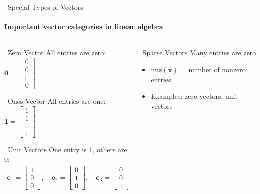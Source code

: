 \documentclass[12pt,aspectratio=169]{beamer}
\begin{document}
\begin{frame}{\faLayerGroup \, Special Types of Vectors}
\framesubtitle{Important vector categories in linear algebra}

\begin{columns}[T]
    \begin{column}{0.5\textwidth}
        \begin{block}{\faCircle \, Zero Vector}
            All entries are zero: $\mathbf{0} = \begin{bmatrix} 0 \\ 0 \\ \vdots \\ 0 \end{bmatrix}$
        \end{block}
        
        \begin{block}{\faSquare \, Ones Vector}
            All entries are one: $\mathbf{1} = \begin{bmatrix} 1 \\ 1 \\ \vdots \\ 1 \end{bmatrix}$
        \end{block}
        
        \begin{block}{\faDotCircle \, Unit Vectors}
            One entry is 1, others are 0:
            \begin{align}
                \mathbf{e}_1 = \begin{bmatrix} 1 \\ 0 \\ 0 \end{bmatrix}, \quad
                \mathbf{e}_2 = \begin{bmatrix} 0 \\ 1 \\ 0 \end{bmatrix}, \quad
                \mathbf{e}_3 = \begin{bmatrix} 0 \\ 0 \\ 1 \end{bmatrix}
            \end{align}
        \end{block}
    \end{column}
    
    \begin{column}{0.45\textwidth}
        \begin{block}{\faEllipsisH \, Sparse Vectors}
            Many entries are zero
            \begin{itemize}
                \item $\text{nnz}(\mathbf{x})$ = number of nonzero entries
                \item Examples: zero vectors, unit vectors
            \end{itemize}
        \end{block}
        

\end{column}
\end{columns}
\end{frame}
\end{document}
